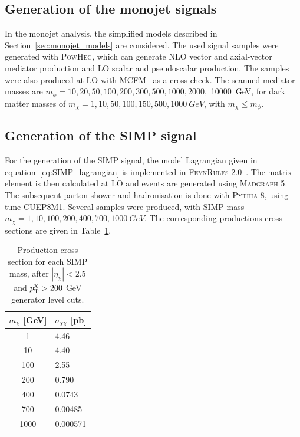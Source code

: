 \subsection{Generation of the monojet signals}
\label{sec:monojet_sim}

In the monojet analysis, the simplified models described in Section~\ref{sec:monojet_models} are considered. The used signal samples were generated with \textsc{PowHeg}, which can generate \ac{NLO} vector and axial-vector mediator production and \ac{LO} scalar and pseudoscalar production. The samples were also produced at \ac{LO} with MCFM~\cite{Campbell:2010ff} as a cross check. The scanned mediator masses are $m_{\phi} = 10, 20, 50, 100, 200, 300, 500, 1000, 2000,$ \SI{10000}{GeV}, for dark matter masses of $m_{\chi} = 1, 10, 50, 100, 150, 500, \SI{1000}{GeV}$, with $m_{\chi} \leq m_{\phi}$.

\subsection{Generation of the SIMP signal}
\label{sec:simp_sim}

For the generation of the \ac{SIMP} signal, the model Lagrangian given in equation~\ref{eq:SIMP_lagrangian} is implemented in \textsc{FeynRules 2.0}~\cite{Alloul:2013bka}. The matrix element is then calculated at \ac{LO} and events are generated using \textsc{Madgraph 5}. The subsequent parton shower and hadronisation is done with \textsc{Pythia 8}, using tune CUEP8M1. Several samples were produced, with \ac{SIMP} mass $m_{\chi} = 1, 10, 100, 200, 400, 700, \SI{1000}{GeV}$. The corresponding productions cross sections are given in Table~\ref{tab:signal_samples}. 

\begin{table}[ht]
  \centering
\begin{tabular}{| c | l |}
\hline
$m_\chi$ [GeV] & $\sigma_{\bar{\chi}\chi}$ [pb] \\
\hline
    1 &  4.46 \\
  10 &   4.40  \\
  100 &  2.55  \\
  200 &   0.790  \\
  400 &   0.0743   \\
  700 &   0.00485  \\
1000 &   0.000571  \\
\hline
\end{tabular}
\caption{Production cross section for each \ac{SIMP} mass, after $|\eta_{\chi}| < 2.5$ and $p_{\rm T}^{\chi} > 200$ GeV generator level cuts.}
\label{tab:signal_samples}
\end{table}

